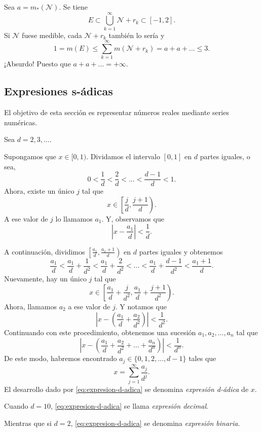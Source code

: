 Sea $a=m_{*}(\mathcal{N})$. 
Se tiene  
\[
E\subset \bigcup\limits_{k=1}^{\infty} \mathcal{N}+r_k
\subset [-1,2]. 
\]
Si $\mathcal{N}$ fuese medible, cada $\mathcal{N}+r_k$ tambi\'en lo ser\'ia y 
\[
1=m(E)\leq \sum\limits_{k=1}^{\infty}m(\mathcal{N}+r_k)=a+a+\ldots\leq 3. 
\]
¡Absurdo! Puesto que $a+a+\ldots=+\infty$.




\begin{subappendices}
  \section{Expresiones s-\'adicas}
 
 El objetivo de esta secci\'on es representar n\'umeros reales mediante series num\'ericas.
 
 Sea $d=2,3,\ldots$. 
 
 Supongamos que $x \in [0,1)$. Dividamos el intervalo  $[0,1]$ en $d$ partes iguales, o sea, 
 \[
 0<\frac{1}{d}<\frac{2}{d}<\ldots<\frac{d-1}{d}<1.
 \]
 Ahora, existe un \'unico $j$ tal que 
 \[
 x \in \left[\frac{j}{d}, \frac{j+1}{d}\right).
 \]
 A ese valor de $j$ lo llamamos $a_1$. 
 Y, observamos que \[ \left|x-\frac{a_1}{d}\right|<\frac{1}{d}.\]
 
 A continuaci\'on,  dividimos $\left[\frac{a_1}{d}, \frac{a_1+1}{d} \right)$ en $d$ partes iguales y obtenemos
 \[
 \frac{a_1}{d}<\frac{a_1}{d}+\frac{1}{d^2}<\frac{a_1}{d}+\frac{2}{d^2}
 < \ldots<\frac{a_1}{d}+\frac{d-1}{d^2}<\frac{a_1+1}{d}.
 \]
 Nuevamente, hay un \'unico $j$ tal que 
 \[x \in \left[\frac{a_1}{d}+\frac{j}{d^2}, \frac{a_1}{d}+\frac{j+1}{d^2}\right).
 \]
 Ahora, llamamos $a_2$  a ese valor de $j$. Y notamos que 
 \[
 \left|x-\left(\frac{a_1}{d}+\frac{a_2}{d^2}\right)\right|<\frac{1}{d^2}.
 \]
 Continuando con este procedimiento, obtenemos una sucesi\'on $a_1,a_2,\ldots,a_n$ tal que 
 \[
 \left|  
 x-\left( \frac{a_1}{d}+\frac{a_2}{d^2}+\ldots+\frac{a_n}{d^n}\right)
 \right|<\frac{1}{d^n}.
 \]
 De este modo, habremos encontrado $a_j \in \{ 0,1,2,\ldots,d-1\}$ tales que 
 \begin{equation}\label{eq:expresion-d-adica}
 x=\sum\limits_{j=1}^{\infty} \frac{a_j}{d^j}.
 \end{equation}
 El desarrollo dado por  \eqref{eq:expresion-d-adica} se denomina \emph{expresi\'on  d-\'adica} de $x$. 
 
 Cuando $d=10$, \eqref{eq:expresion-d-adica} se llama \emph{expresi\'on decimal}.
 
Mientras que si $d=2$, \eqref{eq:expresion-d-adica} se denomina \emph{expresi\'on binaria}.
 

\end{subappendices}
